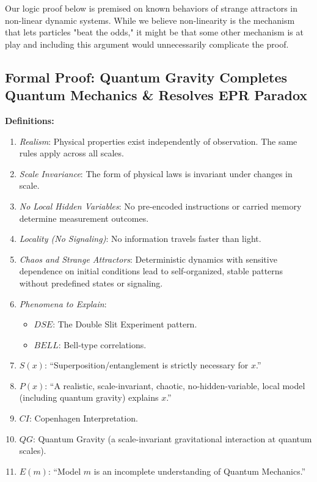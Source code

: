 \documentclass{report}
\begin{document}
Our logic proof below is premised on known behaviors of strange attractors in non-linear dynamic systems. While we believe non-linearity is the mechanism that lets particles "beat the odds," it might be that some other mechanism is at play and including this argument would unnecessarily complicate the proof.

\subsection*{Formal Proof: Quantum Gravity Completes Quantum Mechanics \& Resolves EPR Paradox}
\textbf{Definitions:}
\begin{enumerate}
    \item \emph{Realism}: Physical properties exist independently of observation. The same rules apply across all scales.
    \item \emph{Scale Invariance}: The form of physical laws is invariant under changes in scale.
    \item \emph{No Local Hidden Variables}: No pre-encoded instructions or carried memory determine measurement outcomes.
    \item \emph{Locality (No Signaling)}: No information travels faster than light.
    \item \emph{Chaos and Strange Attractors}: Deterministic dynamics with sensitive dependence on initial conditions lead to self-organized, stable patterns without predefined states or signaling.
    \item \emph{Phenomena to Explain}: 
    \begin{itemize}
        \item $DSE$: The Double Slit Experiment pattern.
        \item $BELL$: Bell-type correlations.
    \end{itemize}
    \item $S(x)$: “Superposition/entanglement is strictly necessary for $x$.”
    \item $P(x)$: “A realistic, scale-invariant, chaotic, no-hidden-variable, local model (including quantum gravity) explains $x$.”
    \item $CI$: Copenhagen Interpretation.
    \item $QG$: Quantum Gravity (a scale-invariant gravitational interaction at quantum scales).
    \item $E(m)$: “Model $m$ is an incomplete understanding of Quantum Mechanics.”
\end{enumerate}
\end{document}
